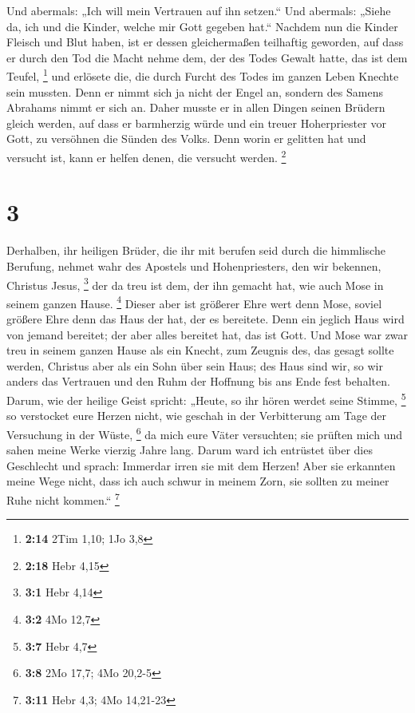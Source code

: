  Und abermals: „Ich will mein Vertrauen auf ihn setzen.``
Und abermals: „Siehe da, ich und die Kinder, welche mir Gott gegeben
hat.``  Nachdem nun die Kinder Fleisch und Blut haben,
ist er dessen gleichermaßen teilhaftig geworden, auf dass er durch den
Tod die Macht nehme dem, der des Todes Gewalt hatte, das ist dem Teufel,
\footnote{\textbf{2:14} 2Tim 1,10; 1Jo 3,8}  und erlösete
die, die durch Furcht des Todes im ganzen Leben Knechte sein mussten.
 Denn er nimmt sich ja nicht der Engel an, sondern des
Samens Abrahams nimmt er sich an.  Daher musste er in
allen Dingen seinen Brüdern gleich werden, auf dass er barmherzig würde
und ein treuer Hoherpriester vor Gott, zu versöhnen die Sünden des
Volks.  Denn worin er gelitten hat und versucht ist, kann
er helfen denen, die versucht werden. \footnote{\textbf{2:18} Hebr 4,15}

\hypertarget{section-1}{%
\section{3}\label{section-1}}

 Derhalben, ihr heiligen Brüder, die ihr mit berufen seid
durch die himmlische Berufung, nehmet wahr des Apostels und
Hohenpriesters, den wir bekennen, Christus Jesus, \footnote{\textbf{3:1}
  Hebr 4,14}  der da treu ist dem, der ihn gemacht hat,
wie auch Mose in seinem ganzen Hause. \footnote{\textbf{3:2} 4Mo 12,7}
 Dieser aber ist größerer Ehre wert denn Mose, soviel
größere Ehre denn das Haus der hat, der es bereitete. 
Denn ein jeglich Haus wird von jemand bereitet; der aber alles bereitet
hat, das ist Gott.  Und Mose war zwar treu in seinem
ganzen Hause als ein Knecht, zum Zeugnis des, das gesagt sollte werden,
 Christus aber als ein Sohn über sein Haus; des Haus sind
wir, so wir anders das Vertrauen und den Ruhm der Hoffnung bis ans Ende
fest behalten.  Darum, wie der heilige Geist spricht:
„Heute, so ihr hören werdet seine Stimme, \footnote{\textbf{3:7} Hebr
  4,7}  so verstocket eure Herzen nicht, wie geschah in
der Verbitterung am Tage der Versuchung in der Wüste, \footnote{\textbf{3:8}
  2Mo 17,7; 4Mo 20,2-5}  da mich eure Väter versuchten;
sie prüften mich und sahen meine Werke vierzig Jahre lang.
 Darum ward ich entrüstet über dies Geschlecht und
sprach: Immerdar irren sie mit dem Herzen! Aber sie erkannten meine Wege
nicht,  dass ich auch schwur in meinem Zorn, sie sollten
zu meiner Ruhe nicht kommen.`` \footnote{\textbf{3:11} Hebr 4,3; 4Mo
  14,21-23}

